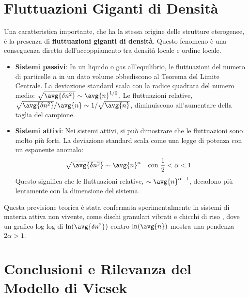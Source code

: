 \section{Fluttuazioni Giganti di Densità}

Una caratteristica importante, che ha la stessa origine delle strutture eterogenee, è la presenza di \textbf{fluttuazioni giganti di densità}. Questo fenomeno è una conseguenza diretta dell'accoppiamento tra densità locale e ordine locale.

\begin{itemize}
    \item \textbf{Sistemi passivi}: In un liquido o gas all'equilibrio, le fluttuazioni del numero di particelle $n$ in un dato volume obbediscono al Teorema del Limite Centrale. La deviazione standard scala con la radice quadrata del numero medio: $\sqrt{\avg{\delta n^2}} \sim \avg{n}^{1/2}$. Le fluttuazioni relative, $\sqrt{\avg{\delta n^2}}/\avg{n} \sim 1/\sqrt{\avg{n}}$, diminuiscono all'aumentare della taglia del campione.
    \item \textbf{Sistemi attivi}: Nei sistemi attivi, si può dimostrare che le fluttuazioni sono molto più forti. La deviazione standard scala come una legge di potenza con un esponente anomalo:
    \begin{equation}
        \sqrt{\avg{\delta n^2}} \sim \avg{n}^{\alpha} \quad \text{con } \frac{1}{2} < \alpha < 1 \quad \text{}
    \end{equation}
    Questo significa che le fluttuazioni relative, $\sim \avg{n}^{\alpha-1}$, decadono più lentamente con la dimensione del sistema.
\end{itemize}
Questa previsione teorica è stata confermata sperimentalmente in sistemi di materia attiva non vivente, come dischi granulari vibrati  e chicchi di riso , dove un grafico log-log di $\ln(\avg{\delta n^2})$ contro $\ln(\avg{n})$ mostra una pendenza $2\alpha > 1$.

\section{Conclusioni e Rilevanza del Modello di Vicsek}

